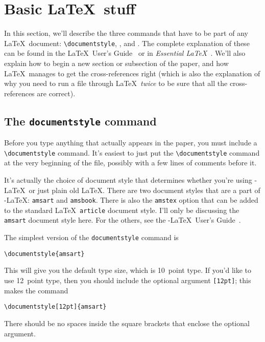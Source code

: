 \section{Basic \LaTeX\ stuff}
\label{sec:basicstuff}

In this section, we'll describe the three commands that have to be
part of any \LaTeX\ document: \verb"\documentstyle",
\verb"", and \verb"".  The complete
explanation of these can be found in the \LaTeX\ User's
Guide~\cite{latex} or in {\em Essential \LaTeX\/}~\cite{essential}.
We'll also explain how to begin a new section or subsection of the
paper, and how \LaTeX\ manages to get the cross-references right
(which is also the explanation of why you need to run a file through
\LaTeX\ {\em twice\/} to be sure that all the cross-references are
correct).


\subsection{The {\tt documentstyle} command}

Before you type anything that actually appears in the paper, you must
include a \verb"\documentstyle" command.  It's easiest to just put
the \verb"\documentstyle" command at the very beginning of the file,
possibly with a few lines of comments before it.

It's actually the choice of document style that determines whether
you're using \AmS-\LaTeX\ or just plain old \LaTeX.  There are two
document styles that are a part of \AmS-\LaTeX: \verb"amsart" and
\verb"amsbook".  There is also the \verb"amstex" option that can be
added to the standard \LaTeX\ \verb"article" document style.  I'll only
be discussing the \verb"amsart" document style here.  For the others,
see the \AmS-\LaTeX\ User's Guide~\cite{amslatexusersguide}.


The simplest version of the \verb"documentstyle" command is
\begin{center}
\verb"\documentstyle{amsart}"
\end{center}
This will give you the default type size, which is 10~point type.  If
you'd like to use 12~point type, then you should include the optional
argument \verb"[12pt]"; this makes the command
\begin{center}
\verb"\documentstyle[12pt]{amsart}"
\end{center}
There should be no spaces inside the square brackets that enclose the
optional argument.

